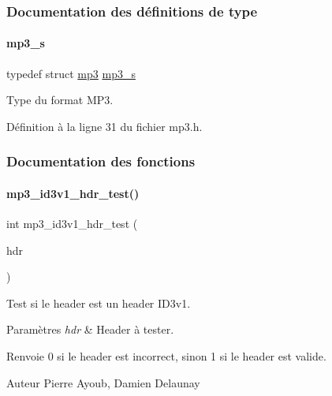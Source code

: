 \subsubsection{Documentation des définitions de type}
\mbox{\label{a00089_a6656cd7a888ac286a329791039a5fbc4}} 
\paragraph{\texorpdfstring{mp3\+\_\+s}{mp3\_s}}
{\footnotesize\ttfamily typedef struct \hyperlink{a00170}{mp3} \hyperlink{a00089_a6656cd7a888ac286a329791039a5fbc4}{mp3\+\_\+s}}

Type du format M\+P3. 

Définition à la ligne 31 du fichier mp3.\+h.



\subsubsection{Documentation des fonctions}
\mbox{\label{a00089_a7ebf97db66e0a6c9230536a642923cb5}} 
\paragraph{\texorpdfstring{mp3\+\_\+id3v1\+\_\+hdr\+\_\+test()}{mp3\_id3v1\_hdr\_test()}}
{\footnotesize\ttfamily int mp3\+\_\+id3v1\+\_\+hdr\+\_\+test (\begin{DoxyParamCaption}\item[{uint32\+\_\+t}]{hdr }\end{DoxyParamCaption})}



Test si le header est un header I\+D3v1. 


\begin{DoxyParams}{Paramètres}
{\em hdr} & Header à tester. \\
\hline
\end{DoxyParams}
\begin{DoxyReturn}{Renvoie}
0 si le header est incorrect, sinon 1 si le header est valide. 
\end{DoxyReturn}
\begin{DoxyAuthor}{Auteur}
Pierre Ayoub, Damien Delaunay 
\end{DoxyAuthor}


